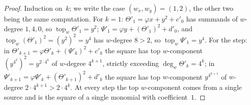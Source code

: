 \documentclass[11pt,a4paper]{article}
\theoremstyle{definition}
\begin{document}
\begin{proof}
Induction on~$k$; we write the case $(w_x, w_y) = (1, 2)$, the other
two being the same computation. For $k = 1$:
$\Theta'_1 = \varphi x + y^2 + c'_0$ has summands of $w$-degree
$1, 4, 0$, so $\operatorname{top}_w \Theta'_1 = y^2$;
$\Psi'_1 = \varphi y + (\Theta'_1)^2 + d'_0$, and
$\operatorname{top}_w (\Theta'_1)^2 = (y^2)^2 = y^4$ has $w$-degree
$8 > 2$, so $\operatorname{top}_w \Psi'_1 = y^4$. For the step:
in $\Theta'_{k+1} = \varphi \Theta'_k + (\Psi'_k)^2 + c'_k$ the square
has top $w$-component $(y^{4^k})^2 = y^{2 \cdot 4^k}$ of $w$-degree
$4^{k+1}$, strictly exceeding $\deg_w \Theta'_k = 4^k$; in
$\Psi'_{k+1} = \varphi \Psi'_k + (\Theta'_{k+1})^2 + d'_k$ the square
has top $w$-component $y^{4^{k+1}}$ of $w$-degree
$2 \cdot 4^{k+1} > 2 \cdot 4^k$. At every step the top $w$-component
comes from a single source and is the square of a single monomial with
coefficient~$1$.
\end{proof}
\end{document}

